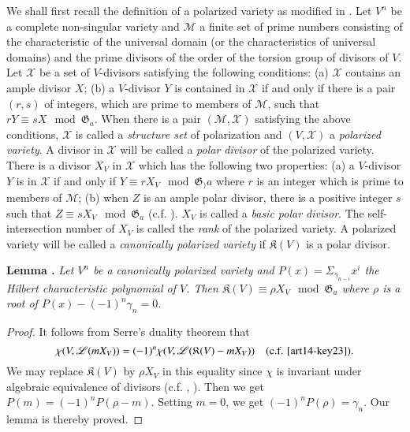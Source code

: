 We shall first recall the definition of a polarized variety as modified in \cite{art14-key16}. Let $V^{n}$ be a complete non-singular variety and $\mathscr{M}$ a finite set of prime numbers consisting of the characteristic of the universal domain (or the characteristics of universal domains) and the prime divisors of the order of the torsion group of divisors of $V$. Let $\mathscr{X}$ be a set of $V$-divisors satisfying the following conditions: (a) $\mathscr{X}$ contains an ample divisor $X$; (b) a $V$-divisor $Y$ is contained in $\mathscr{X}$ if and only if there is a pair $(r,s)$ of integers, which are prime to members of $\mathscr{M}$, such that $rY\equiv sX\mod \mathfrak{G}_{a}$. When there is a pair $(\mathscr{M},\mathscr{X})$ satisfying the above conditions, $\mathscr{X}$ is called a {\em structure set} of polarization and $(V,\mathscr{X})$ a {\em polarized variety}. A divisor in $\mathscr{X}$ will be called a {\em polar divisor} of the polarized variety. There is a divisor $X_{V}$ in $\mathscr{X}$ which has the following two properties: (a) a $V$-divisor $Y$ is in $\mathscr{X}$ if and only if $Y\equiv rX_{V}\mod \mathfrak{G}_){a}$ where $r$ is an integer which is prime to members of $\mathscr{M}$; (b) when $Z$ is an ample polar divisor, there is a positive integer $s$ such that $Z\equiv sX_{V}\mod \mathfrak{G}_{a}$ (c.f. \cite{art14-key16}). $X_{V}$ is called a {\em basic polar divisor}. The self-intersection number of $X_{V}$ is called the {\em rank} of the polarized variety. A polarized variety will be called a {\em canonically polarized variety} if $\mathfrak{K}(V)$ is a polar divisor.

\medskip
\noindent
{\bf Lemma .\label{art14-lem1}}
{\em Let $V^{n}$ be a canonically polarized variety and $P(x)=\Sigma_{\gamma_{n-i}}x^{i}$ the Hilbert characteristic polynomial of $V$. Then $\mathfrak{K}(V)\equiv \rho X_{V}\mod \mathfrak{G}_{a}$ where $\rho$ is a root of $P(x)-(-1)^{n}\gamma_{n}=0$.}

\begin{proof}
It follows from Serre's duality theorem that 
$$
\chi(V,\mathscr{L}(mX_{V}))=(-1)^{n}\chi(V,\mathscr{L}(\mathfrak{K}(V)-mX_{V}))\quad (\text{c.f. \cite{art14-key23}}).
$$\pageoriginale
We may replace $\mathfrak{K}(V)$ by $\rho X_{V}$ in this equality since $\chi$ is invariant under algebraic equivalence of divisors (c.f. \cite{art14-key4}, \cite{art14-key16}). Then we get $P(m)=(-1)^{n}P(\rho-m)$. Setting $m=0$, we get $(-1)^{n}P(\rho)=\gamma_{n}$. Our lemma is thereby proved.
\end{proof}

